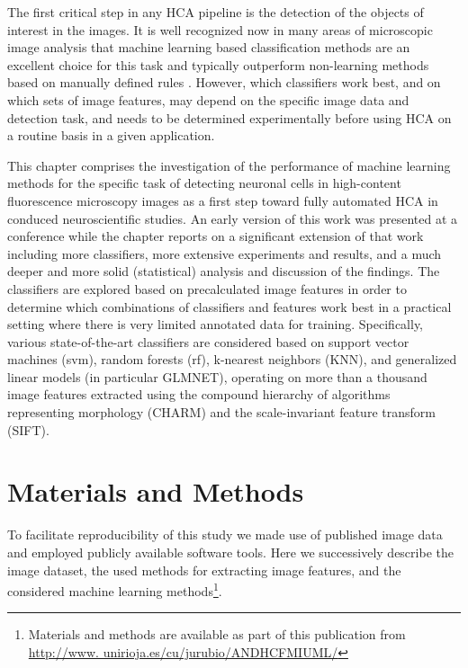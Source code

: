 The first critical step in any HCA pipeline is the detection of the objects of interest in the images. It is well recognized now in many areas of microscopic image analysis that machine learning based classification methods are an excellent choice for this task and typically outperform non-learning methods based on manually defined rules \cite{horvath2011machine, sommer2013machine, kraus2016computer, arganda2017trainable}. However, which classifiers work best, and on which sets of image features, may depend on the specific image data and detection task, and needs to be determined experimentally before using HCA on a routine basis in a given application.

This chapter comprises the investigation of the performance of machine learning methods for the specific task of detecting neuronal cells in high-content fluorescence microscopy images as a first step toward fully automated HCA in conduced neuroscientific studies. An early version of this work was presented at a conference \cite{mata2016automatic} while the chapter reports on a significant extension of that work including more classifiers, more extensive experiments and results, and a much deeper and more solid (statistical) analysis and discussion of the findings. The classifiers are explored based on precalculated image features in order to determine which combinations of classifiers and features work best in a practical setting where there is very limited annotated data for training. Specifically, various state-of-the-art classifiers are considered based on support vector machines (\gls{svm}), random forests (\gls{rf}), k-nearest neighbors (KNN), and generalized linear models (in particular GLMNET), operating on more than a thousand image features extracted using the compound hierarchy of algorithms representing morphology (CHARM) and the scale-invariant feature transform (SIFT).

\section{Materials and Methods}
\label{sec:matmet}

To facilitate reproducibility of this study we made use of published image data and employed publicly available software tools. Here we successively describe the image dataset, the used methods for extracting image features, and the considered machine learning methods\footnote{Materials and methods are available as part of this publication from \\\url{http://www. unirioja.es/cu/jurubio/ANDHCFMIUML/}}.

